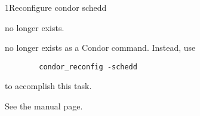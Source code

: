 \begin{ManPage}{\label{man-condor-reconfig-schedd}}
{1}{Reconfigure condor schedd}
\Synopsis {}


\Description 

 no longer exists.


\GenRem
{} no longer exists as a Condor command.
Instead, use
\begin{verbatim}
        condor_reconfig -schedd
\end{verbatim}
to accomplish this task.

\SeeAlso
See the  manual page.

\end{ManPage}
